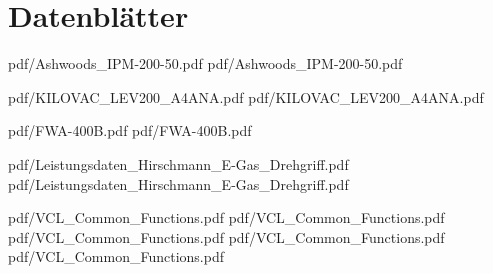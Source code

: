 \newpage

\chapter{Datenblätter}

 {pdf/Ashwoods_IPM-200-50.pdf}
 {pdf/Ashwoods_IPM-200-50.pdf}

 {pdf/KILOVAC_LEV200_A4ANA.pdf}
 {pdf/KILOVAC_LEV200_A4ANA.pdf}

 {pdf/FWA-400B.pdf}
 {pdf/FWA-400B.pdf}

 {pdf/Leistungsdaten_Hirschmann_E-Gas_Drehgriff.pdf}
 {pdf/Leistungsdaten_Hirschmann_E-Gas_Drehgriff.pdf}

 {pdf/VCL_Common_Functions.pdf}
 {pdf/VCL_Common_Functions.pdf}
 {pdf/VCL_Common_Functions.pdf}
 {pdf/VCL_Common_Functions.pdf}
 {pdf/VCL_Common_Functions.pdf}